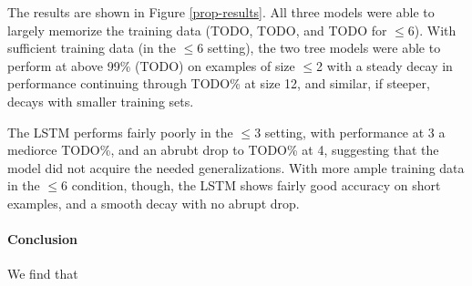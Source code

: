 The results are shown in Figure \ref{prop-results}. All three models were able to largely memorize the training data (TODO, TODO, and TODO for $\le$6). With sufficient training data (in the $\le$6 setting), the two tree models were able to perform at above 99\% (TODO) on examples of size $\le$2 with a steady decay in performance continuing through TODO\% at size 12, and similar, if steeper, decays with smaller training sets.

The LSTM performs fairly poorly in the $\le3$ setting, with performance at 3 a mediorce TODO\%, and an abrubt drop to TODO\% at 4, suggesting that the model did not acquire the needed generalizations. With more ample training data in the $\le6$ condition, though, the LSTM shows fairly good accuracy on short examples, and a smooth decay with no abrupt drop. 

\paragraph{Conclusion}

We find that 
